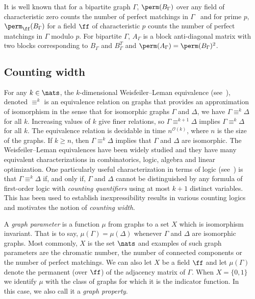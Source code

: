 \documentclass{toc}
\begin{document}
It is well known that for a bipartite graph $\Gamma$, $\perm(B_\Gamma)$ over any field of characteristic zero counts the number of perfect matchings in $\Gamma$~\cite{Harary69} and for prime $p$, $\perm_{\ff}(B_\Gamma)$ for a field $\ff$ of characteristic $p$ counts the number of perfect matchings in $\Gamma$ modulo $p$. For bipartite $\Gamma$, 
$A_\Gamma$ is a block anti-diagonal matrix with two blocks corresponding to $B_\Gamma$ and $B_\Gamma^T$ and $\perm(A_\Gamma) = \perm(B_\Gamma)^2$.


\subsection{Counting width}
For any $k \in \nats$, the $k$-dimensional Weisfeiler--Leman equivalence
(see~\cite{CFI92}), denoted $\equiv^k$ is an equivalence relation on graphs that
provides an approximation
%
of isomorphism in the sense that for isomorphic
graphs $\Gamma$ and $\Delta$, we have $\Gamma \equiv^k \Delta$ for all $k$. Increasing values of $k$
give finer relations, so $\Gamma \equiv^{k+1} \Delta$ implies $\Gamma \equiv^k \Delta$ for all $k$.
The equivalence relation is decidable in time $n^{\mathcal{O}(k)}$, where $n$ is
the size of the graphs. If $k \geq n$, then $\Gamma \equiv^k \Delta$ implies that $\Gamma$ and
$\Delta$ are isomorphic. The Weisfeiler--Leman equivalences have been widely studied
and they have many equivalent characterizations in combinatorics, logic, algebra
and linear optimization.   One particularly useful characterization in
terms of logic (see~\cite{CFI92}) is that $\Gamma \equiv^k \Delta$ if,
and only if, $\Gamma$ and $\Delta$ cannot be distinguished by any
formula of first-order logic with \emph{counting quantifiers} using at most $k+1$ distinct variables.  This has been used to  establish
inexpressibility results in various counting logics and motivates the notion of
\emph{counting width}.

A \emph{graph parameter} is a function $\mu$ from graphs to a set $X$ which is
isomorphism invariant.  That is to say, $\mu(\Gamma) = \mu(\Delta)$ whenever $\Gamma$ and $\Delta$ are isomorphic graphs.  Most commonly, $X$ is the set $\nats$ and examples of such graph parameters are the chromatic number, the number of
connected components or the number of perfect matchings.  We can also
let $X$ be a field $\ff$ and let $\mu(\Gamma)$ denote the permanent
(over $\ff$) of the adjacency matrix of $\Gamma$.  When $X = \{0,1\}$
we identify $\mu$ with the class of graphs for which it is the
indicator function.  In this case, we also call it a \emph{graph property}.
\end{document}
